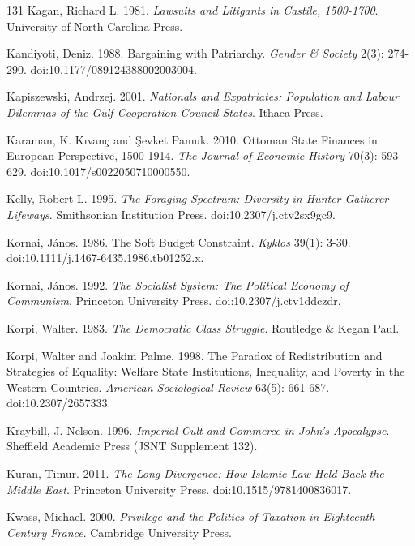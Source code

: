 \documentclass[11pt,letterpaper]{article}
\theoremstyle{definition}
\theoremstyle{remark}
\begin{document}
\begin{thebibliography}{131}
Kagan, Richard L. 1981. \emph{Lawsuits and Litigants in Castile, 1500-1700}. University of North Carolina Press.

Kandiyoti, Deniz. 1988. Bargaining with Patriarchy. \emph{Gender \& Society} 2(3): 274-290. doi:10.1177/089124388002003004.

Kapiszewski, Andrzej. 2001. \emph{Nationals and Expatriates: Population and Labour Dilemmas of the Gulf Cooperation Council States}. Ithaca Press.

Karaman, K. K{\i}van\c{c} and \c{S}evket Pamuk. 2010. Ottoman State Finances in European Perspective, 1500-1914. \emph{The Journal of Economic History} 70(3): 593-629. doi:10.1017/s0022050710000550.

Kelly, Robert L. 1995. \emph{The Foraging Spectrum: Diversity in Hunter-Gatherer Lifeways}. Smithsonian Institution Press. doi:10.2307/j.ctv2sx9gc9.

Kornai, J\'anos. 1986. The Soft Budget Constraint. \emph{Kyklos} 39(1): 3-30. doi:10.1111/j.1467-6435.1986.tb01252.x.

Kornai, J\'anos. 1992. \emph{The Socialist System: The Political Economy of Communism}. Princeton University Press. doi:10.2307/j.ctv1ddczdr.

Korpi, Walter. 1983. \emph{The Democratic Class Struggle}. Routledge \& Kegan Paul.

Korpi, Walter and Joakim Palme. 1998. The Paradox of Redistribution and Strategies of Equality: Welfare State Institutions, Inequality, and Poverty in the Western Countries. \emph{American Sociological Review} 63(5): 661-687. doi:10.2307/2657333.

Kraybill, J. Nelson. 1996. \emph{Imperial Cult and Commerce in John's Apocalypse}. Sheffield Academic Press (JSNT Supplement 132).

Kuran, Timur. 2011. \emph{The Long Divergence: How Islamic Law Held Back the Middle East}. Princeton University Press. doi:10.1515/9781400836017.

Kwass, Michael. 2000. \emph{Privilege and the Politics of Taxation in Eighteenth-Century France}. Cambridge University Press.


\end{thebibliography}
\end{document}
